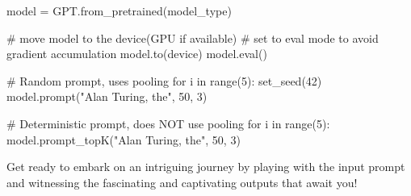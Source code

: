 \begin{exercise}
\begin{exercise}
\begin{python}
model = GPT.from_pretrained(model_type)

# move model to the device(GPU if available)
# set to eval mode to avoid gradient accumulation
model.to(device)
model.eval()

# Random prompt, uses pooling
for i in range(5):
    set_seed(42)
    model.prompt("Alan Turing, the", 50, 3)

# Deterministic prompt, does NOT use pooling
for i in range(5):
    model.prompt_topK("Alan Turing, the", 50, 3)
\end{python}

Get ready to embark on an intriguing journey by playing with the input prompt and witnessing the fascinating and captivating outputs that await you!

\end{exercise}

\end{exercise}